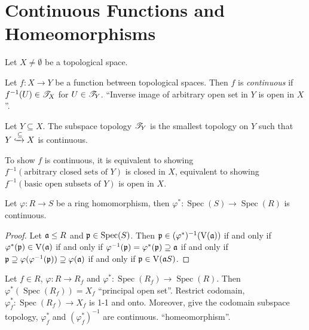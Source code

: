 \section*{Continuous Functions and Homeomorphisms}

Let $X \neq \emptyset$ be a topological space. 

\begin{definition}\label{2.25}
    Let $f: X \to Y$ be a function between topological spaces. Then $f$ is \emph{continuous} if $f^{-1}(U) \in \mathscr{T}_X$ for $U \in \mathscr{T}_Y$. ``Inverse image of arbitrary open set in $Y$ is open in $X$''. 
\end{definition}

\begin{remark}
    Let $Y \subseteq X$. The subspace topology $\mathscr{T}_Y$ is the smallest topology on $Y$ such that $Y \xhookrightarrow \subseteq X$ is continuous. \par 
\end{remark}

\begin{fact}\label{2.26}
    To show $f$ is continuous, it is equivalent to showing $f^{-1}(\text{arbitrary closed sets of $Y$})$ is closed in $X$, equivalent to showing $f^{-1}(\text{basic open subsets of $Y$})$ is open in $X$.
\end{fact}

\begin{theorem}\label{2.27}
    Let $\varphi: R \to S$ be a ring homomorphism, then $\varphi^*: \operatorname{Spec}(S) \to \operatorname{Spec}(R)$ is continuous. 
\end{theorem}

\begin{proof}
    Let $\mathfrak{a} \leq R$ and $\mathfrak{p} \in \operatorname{Spec}(S)$. Then $\mathfrak{p} \in (\varphi^*)^{-1}(\operatorname{V}(\mathfrak{a}))$ if and only if $\varphi^*(\mathfrak{p}) \in \operatorname{V}(\mathfrak{a})$ if and only if $\varphi^{-1}(\mathfrak{p}) = \varphi^*(\mathfrak{p}) \supseteq \mathfrak{a}$ if and only if $\mathfrak{p} \supseteq \varphi(\varphi^{-1}(\mathfrak{p})) \supseteq \varphi(\mathfrak{a})$ if and only if $\mathfrak{p} \in \operatorname{V}(\mathfrak{a} S)$.
\end{proof}

\begin{theorem}\label{2.28}
    Let $f \in R$, $\varphi: R \to R_f$ and $\varphi^*: \operatorname{Spec}(R_f) \to \operatorname{Spec}(R)$. Then  $\varphi^*(\operatorname{Spec}(R_f)) = X_f$ ``principal open set''. Restrict codomain, $\varphi_f^*: \operatorname{Spec}(R_f) \to X_f$ is 1-1 and onto. Moreover, give the codomain subspace topology, $\varphi_f^*$ and $(\varphi_f^*)^{-1}$ are continuous. ``homeomorphism''. 
\end{theorem}

